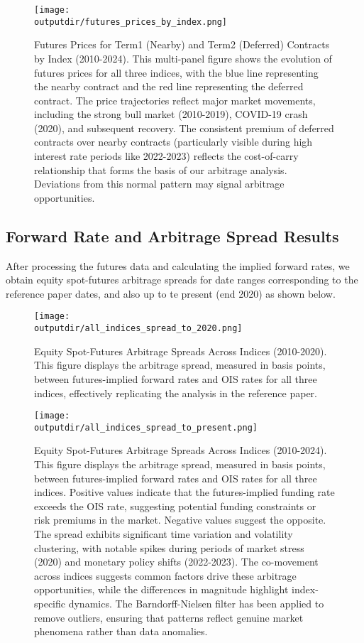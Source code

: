 \documentclass{article}
\newcommand{\outputdir}{../_output}
\begin{document}
\begin{figure}[H]
  \centering
  \texttt{[image: \\outputdir/futures\_prices\_by\_index.png]}
  \caption{Futures Prices for Term1 (Nearby) and Term2 (Deferred) Contracts by Index (2010-2024). This multi-panel figure shows the evolution of futures prices for all three indices, with the blue line representing the nearby contract and the red line representing the deferred contract. The price trajectories reflect major market movements, including the strong bull market (2010-2019), COVID-19 crash (2020), and subsequent recovery. The consistent premium of deferred contracts over nearby contracts (particularly visible during high interest rate periods like 2022-2023) reflects the cost-of-carry relationship that forms the basis of our arbitrage analysis. Deviations from this normal pattern may signal arbitrage opportunities.}
  \label{fig:futures_prices}
\end{figure}

\subsection{Forward Rate and Arbitrage Spread Results}

After processing the futures data and calculating the implied forward rates, we obtain equity spot-futures arbitrage spreads for date ranges corresponding to the reference paper dates, and also up to te present (end 2020) as shown below.


\begin{figure}[H]
  \centering
  \texttt{[image: \\outputdir/all\_indices\_spread\_to\_2020.png]}
  \caption{Equity Spot-Futures Arbitrage Spreads Across Indices (2010-2020). This figure displays the arbitrage spread, measured in basis points, between futures-implied forward rates and OIS rates for all three indices, effectively replicating the analysis in the reference paper.}
  \label{fig:arbitrage_spreads_2020}
\end{figure}


\begin{figure}[H]
  \centering
  \texttt{[image: \\outputdir/all\_indices\_spread\_to\_present.png]}
  \caption{Equity Spot-Futures Arbitrage Spreads Across Indices (2010-2024). This figure displays the arbitrage spread, measured in basis points, between futures-implied forward rates and OIS rates for all three indices. Positive values indicate that the futures-implied funding rate exceeds the OIS rate, suggesting potential funding constraints or risk premiums in the market. Negative values suggest the opposite. The spread exhibits significant time variation and volatility clustering, with notable spikes during periods of market stress (2020) and monetary policy shifts (2022-2023). The co-movement across indices suggests common factors drive these arbitrage opportunities, while the differences in magnitude highlight index-specific dynamics. The Barndorff-Nielsen filter has been applied to remove outliers, ensuring that patterns reflect genuine market phenomena rather than data anomalies.}
  \label{fig:arbitrage_spreads_present}
\end{figure}
\end{document}
